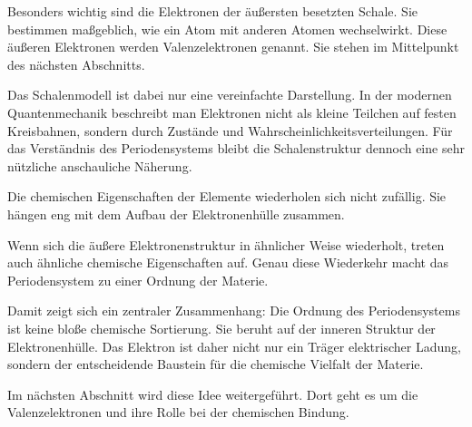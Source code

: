 Besonders wichtig sind die Elektronen der äußersten besetzten Schale. Sie
bestimmen maßgeblich, wie ein Atom mit anderen Atomen wechselwirkt. Diese
äußeren Elektronen werden Valenzelektronen genannt.
Sie stehen im Mittelpunkt des nächsten Abschnitts.

Das Schalenmodell ist dabei nur eine vereinfachte Darstellung. In der modernen
Quantenmechanik beschreibt man Elektronen nicht als kleine Teilchen auf festen
Kreisbahnen, sondern durch Zustände und Wahrscheinlichkeitsverteilungen. Für
das Verständnis des Periodensystems bleibt die Schalenstruktur dennoch eine
sehr nützliche anschauliche Näherung.

\begin{DidacticBox}
	\label{box:warum-periodensystem-periodisch-ist}
	Die chemischen Eigenschaften der Elemente wiederholen sich nicht zufällig.
	Sie hängen eng mit dem Aufbau der Elektronenhülle zusammen.
	
	Wenn sich die äußere Elektronenstruktur in ähnlicher Weise wiederholt,
	treten auch ähnliche chemische Eigenschaften auf. Genau diese Wiederkehr
	macht das Periodensystem zu einer Ordnung der Materie.
\end{DidacticBox}

Damit zeigt sich ein zentraler Zusammenhang: Die Ordnung des Periodensystems
ist keine bloße chemische Sortierung. Sie beruht auf der inneren Struktur der
Elektronenhülle. Das Elektron ist daher nicht nur ein Träger elektrischer
Ladung, sondern der entscheidende Baustein für die chemische Vielfalt der
Materie.

Im nächsten Abschnitt wird diese Idee weitergeführt. Dort geht es um die
Valenzelektronen und ihre Rolle bei der chemischen Bindung.